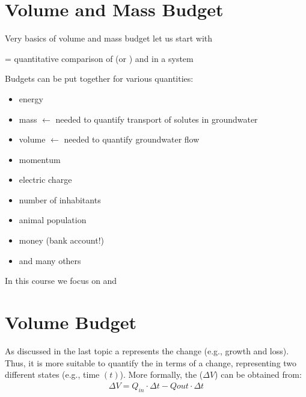 \documentclass[letterpaper,10pt,english]{jupyterBook}
\begin{document}
\section{Volume and Mass Budget}
\label{\detokenize{content/background/03_basic_hydrogeology:volume-and-mass-budget}}
\sphinxAtStartPar
Very basics of volume and mass budget \sphinxhyphen{} let us start with 

\sphinxAtStartPar
{} = quantitative comparison of  (or ) and  in a system

\sphinxAtStartPar
Budgets can be put together for various quantities:
\begin{itemize}
\item {} 
\sphinxAtStartPar
energy

\item {} 
\sphinxAtStartPar
mass \(\leftarrow\) needed to quantify transport of solutes in groundwater

\item {} 
\sphinxAtStartPar
volume \(\leftarrow\)  needed to quantify groundwater flow

\item {} 
\sphinxAtStartPar
momentum

\item {} 
\sphinxAtStartPar
electric charge

\item {} 
\sphinxAtStartPar
number of inhabitants

\item {} 
\sphinxAtStartPar
animal population

\item {} 
\sphinxAtStartPar
money (bank account!)

\item {} 
\sphinxAtStartPar
and many others

\end{itemize}

\sphinxAtStartPar
In this course we focus on  and 


\section{Volume Budget}
\label{\detokenize{content/background/03_basic_hydrogeology:volume-budget}}
\sphinxAtStartPar
As discussed in the last topic a  represents the change (e.g., growth and loss). Thus, it is more suitable to quantify the  in terms of a change, representing two different states (e.g., time \((t)\)). More formally, the  (\(\Delta V\)) can be obtained from:
\begin{equation*}
\begin{split}
\Delta V = Q_{in} \cdot \Delta t - Q{out} \cdot \Delta t 
\end{split}
\end{equation*}
\end{document}
